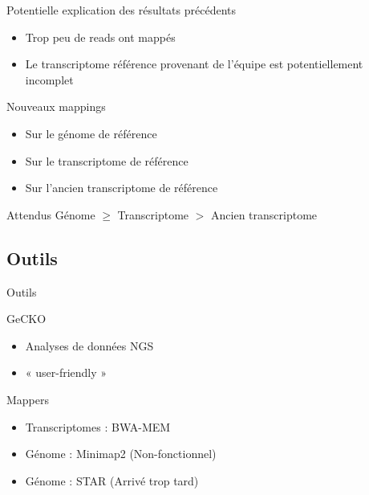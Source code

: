 \begin{frame}
    \begin{alertblock}{Potentielle explication des résultats précédents}
        \begin{itemize}
            \item Trop peu de reads ont mappés
            \item Le transcriptome référence provenant de l'équipe est potentiellement incomplet
        \end{itemize}
    \end{alertblock}

    \begin{alertblock}{Nouveaux mappings}
        \begin{itemize}
            \item Sur le génome de référence
            \item Sur le transcriptome de référence
            \item Sur l'ancien transcriptome de référence
        \end{itemize}
    \end{alertblock}

    \begin{alertblock}{Attendus}
        Génome $\geq$ Transcriptome $>$ Ancien transcriptome
    \end{alertblock}

\end{frame}

\subsection{Outils}


\begin{frame}{Outils}
   
    \begin{block}{GeCKO \cite{ardisson_gecko_2024}}
        \begin{itemize}
            \item Analyses de données NGS
            \item « user-friendly »
        \end{itemize}
    \end{block}


    \begin{block}{Mappers}
        \begin{itemize}
            \item Transcriptomes : BWA-MEM
            \item Génome : Minimap2 \pause (Non-fonctionnel)
            \item Génome : STAR (Arrivé trop tard)
        \end{itemize}
    \end{block}
\end{frame}
% 
